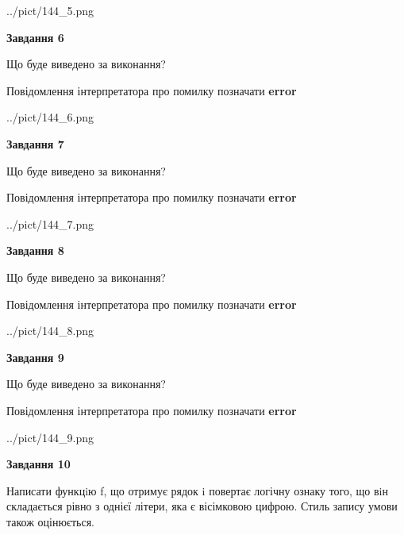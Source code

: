 \documentclass[12pt, ukrainian]{article}
\begin{document}
{\begin {large}
\begin{center}
	{../pict/144_5.png}
\end{center}
\newpage

{\begin {center}\textbf{Завдання 6}\end {center}}\par
Що буде виведено за виконання? \par
Повідомлення інтерпретатора про помилку позначати \textbf{error}

\begin{center}
	{../pict/144_6.png}
\end{center}
\newpage

{\begin {center}\textbf{Завдання 7}\end {center}}\par
Що буде виведено за виконання? \par
Повідомлення інтерпретатора про помилку позначати \textbf{error}

\begin{center}
	{../pict/144_7.png}
\end{center}
\newpage

{\begin {center}\textbf{Завдання 8}\end {center}}\par
Що буде виведено за виконання? \par
Повідомлення інтерпретатора про помилку позначати \textbf{error}

\begin{center}
	{../pict/144_8.png}
\end{center}
\newpage

{\begin {center}\textbf{Завдання 9}\end {center}}\par
Що буде виведено за виконання? \par
Повідомлення інтерпретатора про помилку позначати \textbf{error}

\begin{center}
	{../pict/144_9.png}
\end{center}
\newpage

{\begin {center}\textbf{Завдання 10}\end {center}}\par

Написати функцiю f, що отримує рядок i повертає логічну ознаку того, що вiн складається рівно з однієї літери, яка є вісімковою цифрою. Стиль запису умови також оцінюється.\par
\newpage

\end {large}}
\end{document}

